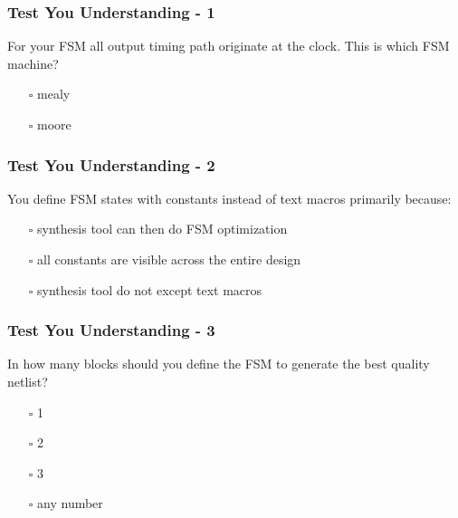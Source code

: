 \documentclass[t, notes, xcolor=table]{beamer}
\begin{document}
\begin{frame}
\frametitle{Test You Understanding - 1}
For your FSM all output timing path originate at the clock. This is which FSM machine?
\begin{itemize}
\item[$\square$] mealy
\item[$\square$] moore
\end{itemize}
\end{frame}

\begin{frame}
\frametitle{Test You Understanding - 2}
You define FSM states with constants instead of text macros primarily because:
\begin{itemize}
\item[$\square$] synthesis tool can then do FSM optimization
\item[$\square$] all constants are visible across the entire design
\item[$\square$] synthesis tool do not except text macros
\end{itemize}
\end{frame}

\begin{frame}
\frametitle{Test You Understanding - 3}
In how many blocks should you define the FSM to generate the best quality netlist?
\begin{itemize}
\item[$\square$] 1
\item[$\square$] 2
\item[$\square$] 3
\item[$\square$] any number
\end{itemize}
\end{frame}
\end{document}
